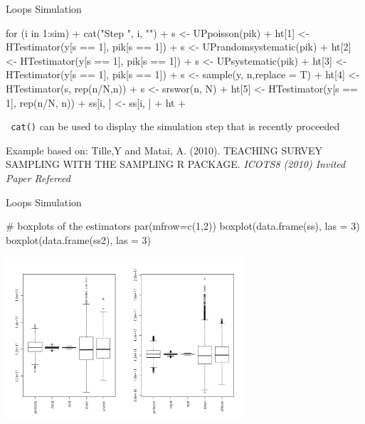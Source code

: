 \documentclass[11pt,german,hideothersubsections]{beamer}
\newcommand{\R}[1]{{\tt \color{blue}  #1}}
\begin{document}
\begin{frame}[fragile]{Loops} {Simulation}
\footnotesize{
\begin{Schunk}
\begin{Sinput}
 for (i in 1:sim) {
+     cat("Step ", i, "\n")
+     s <- UPpoisson(pik)
+     ht[1] <- HTestimator(y[s == 1], pik[s == 1])
+     s <- UPrandomsystematic(pik)
+     ht[2] <- HTestimator(y[s == 1], pik[s == 1])
+     s <- UPsystematic(pik)
+     ht[3] <- HTestimator(y[s == 1], pik[s == 1])
+     s <- sample(y, n,replace = T)
+     ht[4] <- HTestimator(s, rep(n/N,n))
+     s <- srswor(n, N)
+     ht[5] <- HTestimator(y[s == 1], rep(n/N, n))
+     ss[i, ] <- ss[i, ] + ht 
+   } 
\end{Sinput}
\end{Schunk}
}
\begin{itemize}\footnotesize{
\item \R{cat()} can be used to display the simulation step that is recently proceeded
}
\end{itemize}
\tiny{Example based on: Tille,Y and Matai, A. (2010). TEACHING SURVEY SAMPLING WITH THE SAMPLING R PACKAGE. \emph{ICOTS8 (2010) Invited Paper Refereed}}
\end{frame}
\begin{frame}[fragile]{Loops} {Simulation}
\footnotesize{
\begin{Schunk}
\begin{Sinput}
 # boxplots of the estimators
   par(mfrow=c(1,2))
   boxplot(data.frame(ss), las = 3) 
   boxplot(data.frame(ss2), las = 3)
\end{Sinput}
\end{Schunk}
}
\includegraphics[width=\textwidth, height=6cm]{../../../tutorial/figure/Verteilungen.png}

\end{frame}
\end{document}

